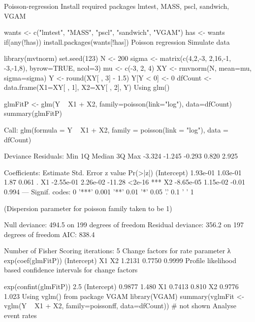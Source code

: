 Poisson-regression
Install required packages
lmtest, MASS, pscl, sandwich, VGAM

wants <- c("lmtest", "MASS", "pscl", "sandwich", "VGAM")
has   <- wants %
if(any(!has)) install.packages(wants[!has])
Poisson regression
Simulate data

library(mvtnorm)
set.seed(123)
N     <- 200
sigma <- matrix(c(4,2,-3, 2,16,-1, -3,-1,8), byrow=TRUE, ncol=3)
mu    <- c(-3, 2, 4)
XY    <- rmvnorm(N, mean=mu, sigma=sigma)
Y     <- round(XY[ , 3] - 1.5)
Y[Y < 0] <- 0
dfCount <- data.frame(X1=XY[ , 1], X2=XY[ , 2], Y)
Using glm()

glmFitP <- glm(Y ~ X1 + X2, family=poisson(link="log"), data=dfCount)
summary(glmFitP)

Call:
glm(formula = Y ~ X1 + X2, family = poisson(link = "log"), data = dfCount)

Deviance Residuals: 
   Min      1Q  Median      3Q     Max  
-3.324  -1.245  -0.293   0.820   2.925  

Coefficients:
             Estimate Std. Error z value Pr(>|z|)    
(Intercept)  1.93e-01   1.03e-01    1.87    0.061 .  
X1          -2.55e-01   2.26e-02  -11.28   <2e-16 ***
X2          -8.65e-05   1.15e-02   -0.01    0.994    
---
Signif. codes:  0 '***' 0.001 '**' 0.01 '*' 0.05 '.' 0.1 ' ' 1 

(Dispersion parameter for poisson family taken to be 1)

    Null deviance: 494.5  on 199  degrees of freedom
Residual deviance: 356.2  on 197  degrees of freedom
AIC: 838.4

Number of Fisher Scoring iterations: 5
Change factors for rate parameter λ
exp(coef(glmFitP))
(Intercept)          X1          X2 
     1.2131      0.7750      0.9999 
Profile likelihood based confidence intervals for change factors

exp(confint(glmFitP))
             2.5 %
(Intercept) 0.9877  1.480
X1          0.7413  0.810
X2          0.9776  1.023
Using vglm() from package VGAM
library(VGAM)
summary(vglmFit <- vglm(Y ~ X1 + X2, family=poissonff, data=dfCount))
# not shown
Analyse event rates

